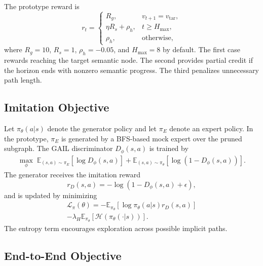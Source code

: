 \documentclass[journal]{IEEEtran}
\newcommand{\bbE}{\mathbb{E}}
\begin{document}
The prototype reward is
\begin{equation}
r_t =
\begin{cases}
R_g, & v_{t+1}=v_{\mathrm{tar}},\\
\eta R_s + \rho_h, & t\geq H_{\max},\\
\rho_h, & \mathrm{otherwise},
\end{cases}
\label{eq:reward}
\end{equation}
where $R_g=10$, $R_s=1$, $\rho_h=-0.05$, and $H_{\max}=8$ by default. The first case rewards reaching the target semantic node. The second provides partial credit if the horizon ends with nonzero semantic progress. The third penalizes unnecessary path length.

\subsection{Imitation Objective}

Let $\pi_\theta(a|s)$ denote the generator policy and let $\pi_E$ denote an expert policy. In the prototype, $\pi_E$ is generated by a BFS-based mock expert over the pruned subgraph. The GAIL discriminator $D_\phi(s,a)$ is trained by
\begin{multline}
\max_\phi\;
\bbE_{(s,a)\sim \pi_E}\left[\log D_\phi(s,a)\right]
+ \bbE_{(s,a)\sim \pi_\theta}
\left[\log(1-D_\phi(s,a))\right].
\label{eq:gail_d}
\end{multline}
The generator receives the imitation reward
\begin{equation}
r_D(s,a)=-\log(1-D_\phi(s,a)+\epsilon),
\label{eq:gail_reward}
\end{equation}
and is updated by minimizing
\begin{multline}
\mathcal{L}_{\pi}(\theta)=
-\bbE_{\pi_\theta}\left[\log \pi_\theta(a|s) r_D(s,a)\right]\\
-\lambda_H \bbE_{\pi_\theta}
\left[\mathcal{H}(\pi_\theta(\cdot|s))\right].
\label{eq:policy_loss}
\end{multline}
The entropy term encourages exploration across possible implicit paths.

\subsection{End-to-End Objective}
\end{document}
